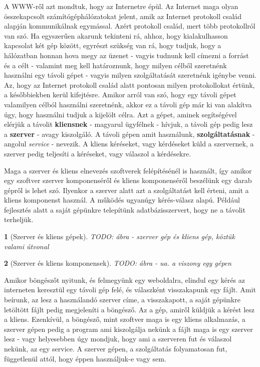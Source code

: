 \documentclass[a4paper, 12pt, oneside]{article}
\newtheorem*{defin}{}
\begin{document}
A WWW-ről azt mondtuk, hogy az Internetre épül. Az Internet maga olyan összekapcsolt számítógéphálózatokat jelent, amik az Internet protokoll család alapján kommunikálnak egymással. Azért protokoll család, mert több protokollról van szó. Ha egyszerűen akarunk tekinteni rá, ahhoz, hogy kialakulhasson kapcsolat két gép között, egyrészt szükség van rá, hogy tudjuk, hogy a hálózatban honnan hova megy az üzenet - vagyis tudnunk kell címezni a forrást és a célt - valamint meg kell határoznunk, hogy milyen célből szeretnénk használni egy távoli gépet - vagyis milyen szolgáltatását szeretnénk igénybe venni. Az, hogy az Internet protokoll család alatt pontosan milyen protokollokat értünk, a későbbiekben kerül kifejtésre.
\bigbreak
Amikor arról van szó, hogy egy távoli gépet valamilyen célból használni szeretnénk, akkor ez a távoli gép már ki van alakítva úgy, hogy használni tudjuk a kijelölt célra. Azt a gépet, aminek segítségével elérjük a távolit \textbf{kliensnek} - magyarul ügyfélnek - hívjuk, a távoli gép pedig lesz a \textbf{szerver} - avagy kiszolgáló. A távoli gépen amit használunk, \textbf{szolgáltatásnak} - angolul \textit{service} - nevezik. A kliens kéréseket, vagy kérdéseket küld a szervernek, a szerver pedig teljesíti a kéréseket, vagy válaszol a kérdésekre.

Maga a szerver és kliens elnevezés szoftverek felépítésénél is használt, így amikor egy szoftver szerver komponenséről és kliens komponenséről beszélünk egy darab gépről is lehet szó. Ilyenkor a szerver alatt azt a szolgáltatást kell érteni, amit a kliens komponenst használ. A működés ugyanúgy kérés-válasz alapú. Például fejlesztés alatt a saját gépünkre telepítünk adatbázisszervert, hogy ne a távolit terheljük.

\begin{center}
\begin{defin}[Szerver és kliens gépek]
TODO: ábra - szerver gép és kliens gép, köztük valami útvonal
\end{defin}
\end{center}

\begin{center}
\begin{defin}[Szerver és kliens komponensek]
TODO: ábra - ua. a viszony egy gépen
\end{defin}
\end{center}

Amikor böngészőt nyitunk, és felmegyünk egy weboldalra, elindul egy kérés az interneten keresztül egy távoli gép felé, és válaszként visszakapunk egy fájlt. Amit beírunk, az lesz a használandó szerver címe, a visszakapott, a saját gépünkre letöltött fájlt pedig megjeleníti a böngésző. Az a gép, amiről küldjük a kérést lesz a kliens. Ezenkívül, a böngésző, mint szoftver maga is egy kliens alkalmazás, a szerver gépen pedig a program ami kiszolgálja nekünk a fájlt maga is egy szerver lesz - vagy helyesebben úgy mondjuk, hogy ami a szerveren fut és válaszol nekünk, az egy service. A szerver gépen, a szolgáltatás folyamatosan fut, függetlenül attól, hogy éppen használjuk-e vagy sem.
\end{document}

